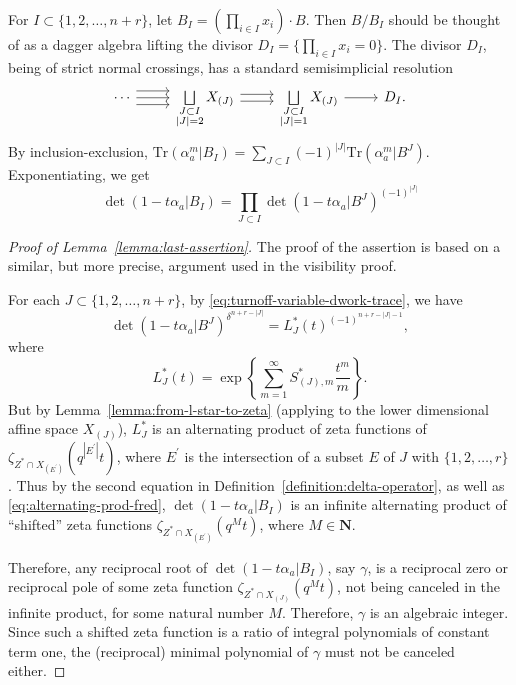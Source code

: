 \documentclass{amsart}
\numberwithin{equation}{section}
\theoremstyle{plain}
\theoremstyle{definition}
\renewcommand{\mathbb}{\mathbf}
\begin{document}
For \(I \subset \{1,2,\ldots,n+r\}\),
let \(B_{I} = (\prod_{i\in I}x_{i})\cdot B\).
Then \(B/B_I\) should be thought of as a dagger algebra lifting
the divisor \(D_{I}=\{\prod_{i\in I}x_{i}=0\}\). The divisor
\(D_I\), being of strict normal crossings, has a standard semisimplicial resolution
\begin{equation*}
  \begin{tikzcd}
    \cdots \ar[shift left=2]{r} \ar[shift right=2]{r} \ar{r}&  \bigsqcup\limits_{\substack{J \subset I \\ |J|=2}} X_{(J)}\ar[shift left]{r} \ar[shift right]{r}& \bigsqcup\limits_{\substack{J \subset I\\ |J|=1}} X_{(J)} \ar{r} & D_{I}.
  \end{tikzcd}
\end{equation*}
By inclusion-exclusion,
\(\mathrm{Tr}(\alpha_{a}^m|{B_I})=\sum_{J\subset I} (-1)^{|J|}\mathrm{Tr}(\alpha_{a}^m|{B^J})\).
Exponentiating, we get
\begin{equation}\label{eq:alternating-prod-fred}
  \det(1 - t\alpha_{a}|{B_I}) = \prod_{J\subset I} \det(1 - t\alpha_{a}|{B^J})^{(-1)^{|J|}}
\end{equation}


\begin{proof}[Proof of Lemma~\ref{lemma:last-assertion}]
  The proof of the assertion is based on a similar,
  but more precise, argument used in the visibility proof.

  For each \(J \subset \{1,2,\ldots,n+r\}\), by
  \eqref{eq:turnoff-variable-dwork-trace},
  we have
  \begin{equation*}
    \det(1-t\alpha_{a}|{B^J})^{\delta^{n+r-|J|}} = L^*_{J}(t)^{(-1)^{n+r-|J|-1}},
  \end{equation*}
  where
  \begin{equation*}
    L_{J}^*(t) = \exp\left\{ \sum_{m=1}^{\infty}S_{(J),m}^{*} \frac{t^m}{m}\right\}.
  \end{equation*}
  But by Lemma~\ref{lemma:from-l-star-to-zeta} (applying to the lower
  dimensional affine space \(X_{(J)}\)), \(L_{J}^{*}\) is an alternating product of
  zeta functions of \(\zeta_{Z^*\cap X_{(E^{\prime})}}(q^{|E^{\prime}|}t)\),
  where \(E^{\prime}\) is the intersection of a subset \(E\) of \(J\) with \(\{1,2,\ldots,r\}\).
  Thus by the second equation in Definition~\ref{definition:delta-operator},
  as well as
  \eqref{eq:alternating-prod-fred},
  \(\det(1-t\alpha_{a}|{B_I})\) is an infinite alternating product of
  ``shifted'' zeta functions
  \(\zeta_{Z^*\cap X_{(E^{\prime})}}(q^{M}t)\), where \(M \in \mathbb{N}\).

  Therefore, any reciprocal root of
  \(\det(1-t\alpha_{a}| B_I)\), say \(\gamma\), is a reciprocal
  zero or reciprocal pole of some zeta function
  \(\zeta_{Z^*\cap X_{(J)}}(q^{M}t)\), not being canceled in the infinite
  product, for some natural number \(M\).
  Therefore, \(\gamma\) is an algebraic integer.
  Since such a shifted zeta function is a ratio of integral polynomials of
  constant term one, the (reciprocal) minimal polynomial of \(\gamma\) must not be
  canceled either.
\end{proof}
\end{document}
